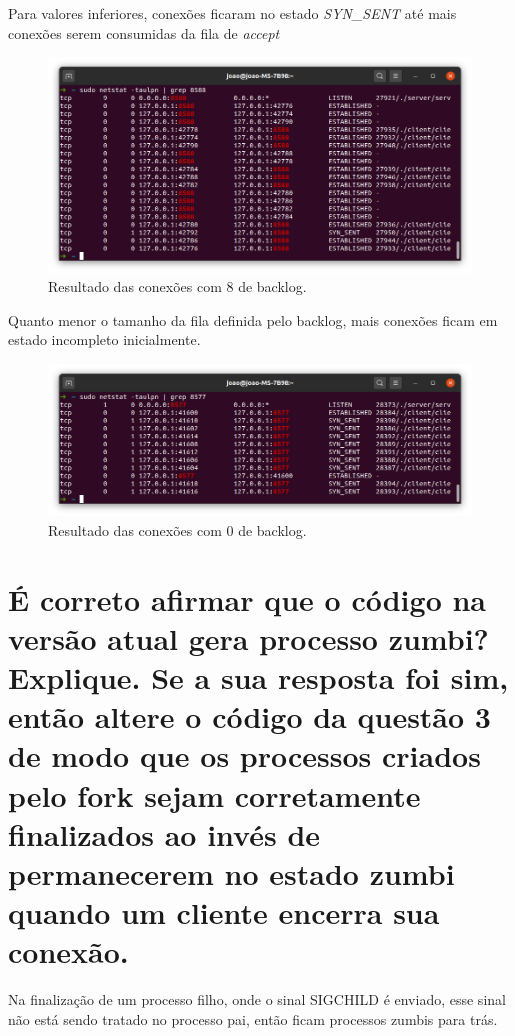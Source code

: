 \documentclass[12pt,a4paper]{report}
\begin{document}
Para valores inferiores, conexões ficaram no estado \emph{SYN\_SENT} até mais conexões serem consumidas da fila de \emph{accept}

\begin{figure}[H]
  \includegraphics[width=\linewidth]{8back.png}
  \caption{Resultado das conexões com 8 de backlog.}
\end{figure}

Quanto menor o tamanho da fila definida pelo backlog, mais conexões ficam em estado incompleto inicialmente.

\begin{figure}[H]
  \includegraphics[width=\linewidth]{0back.png}
  \caption{Resultado das conexões com 0 de backlog.}
\end{figure}

\section{É correto afirmar que o código na versão atual gera processo zumbi? Explique. Se a
sua resposta foi sim, então altere o código da questão 3 de modo que os processos
criados pelo fork sejam corretamente finalizados ao invés de permanecerem no estado
zumbi quando um cliente encerra sua conexão.}

Na finalização de um processo filho, onde o sinal SIGCHILD é enviado, esse sinal não está sendo tratado no processo pai, então ficam processos zumbis para trás.
\end{document}
